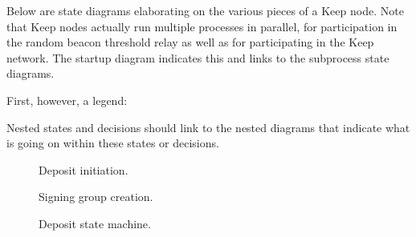 \documentclass{article}
\begin{document}
Below are state diagrams elaborating on the various pieces of a Keep node. Note
that Keep nodes actually run multiple processes in parallel, for participation
in the random beacon threshold relay as well as for participating in the Keep
network. The startup diagram indicates this and links to the subprocess state
diagrams.

First, however, a legend:

\vspace{0.5cm}

\begin{center}
\end{center}

\vspace{0.5cm}

Nested states and decisions should link to the nested diagrams that indicate
what is going on within these states or decisions.

\vspace{0.5cm}

\begin{figure}
  \centering
  

  \caption{\label{fig:deposit-initiation}Deposit initiation.}
\end{figure}



\clearpage

\begin{figure}
  \centering
  

  \caption{\label{fig:signing-group-creation}Signing group creation.}
\end{figure}


\begin{figure}
  \centering
  

  \caption{\label{fig:deposit-state-machine}Deposit state machine.}
\end{figure}
\end{document}
